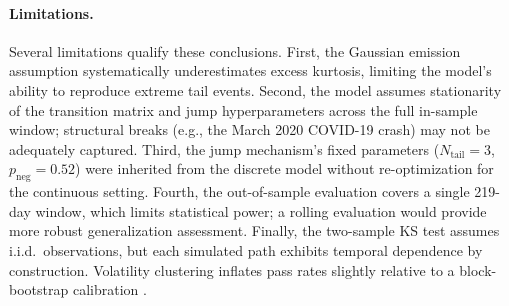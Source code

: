 \paragraph{Limitations.}
Several limitations qualify these conclusions.
First, the Gaussian emission assumption systematically underestimates excess kurtosis, limiting the model's ability to reproduce extreme tail events.
Second, the model assumes stationarity of the transition matrix and jump hyperparameters across the full in-sample window; structural breaks (e.g., the March 2020 COVID-19 crash) may not be adequately captured.
Third, the jump mechanism's fixed parameters ($N_{\text{tail}} = 3$, $p_{\text{neg}} = 0.52$) were inherited from the discrete model without re-optimization for the continuous setting.
Fourth, the out-of-sample evaluation covers a single 219-day window, which limits statistical power; a rolling evaluation would provide more robust generalization assessment.
Finally, the two-sample KS test assumes i.i.d.\ observations, but each simulated path exhibits temporal dependence by construction.
Volatility clustering inflates pass rates slightly relative to a block-bootstrap calibration \citep{alswaidan2026hybrid}.
